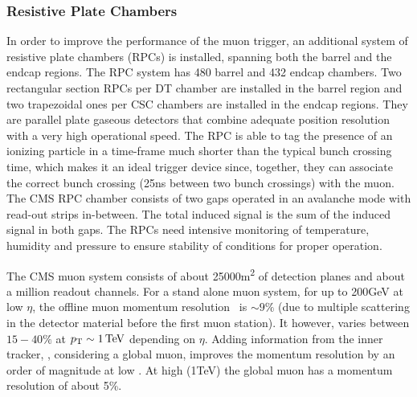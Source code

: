 \subsubsection{Resistive Plate Chambers}
In order to improve the performance of the muon trigger, an additional system of resistive plate chambers (RPCs) is installed, spanning both the 
barrel and the endcap regions. The RPC system has 480 barrel and 432 endcap chambers. Two rectangular section RPCs per DT chamber are installed 
in the barrel region and two trapezoidal ones per CSC chambers are installed in the endcap regions. They are parallel plate gaseous detectors that 
combine adequate position resolution with a very high operational speed. The RPC is able to tag the presence of an ionizing particle in a time-frame
much shorter than the typical bunch crossing time, which makes it an ideal trigger device since, together, they can associate the correct bunch 
crossing (25\unit{ns} between two bunch crossings) with the muon. The CMS RPC chamber consists of two gaps operated in an avalanche mode with read-out 
strips in-between. The total induced signal is the sum of the induced signal in both gaps. The RPCs need intensive monitoring of temperature, humidity 
and pressure to ensure stability of conditions for proper operation. 

The CMS muon system consists of about 25000\unit{m^{2}} of detection planes and about a million readout channels. For a stand 
alone muon system, for \pt up to 200\unit{GeV} at low $\eta$, the offline muon momentum resolution~\cite{Chatrchyan:2008aa} is $\sim 9\%$ 
(due to multiple scattering in the detector material before the first muon station). It however, varies between $15-40\%$ at 
$p_{\mathrm T}\sim1\mathrm{\,TeV}$ depending on $\eta$. Adding information from the inner tracker, \ie, considering a global muon, improves the
momentum resolution by an order of magnitude at low \pt. At high \pt (1\unit{TeV}) the global muon has a momentum resolution of about 5\%.

